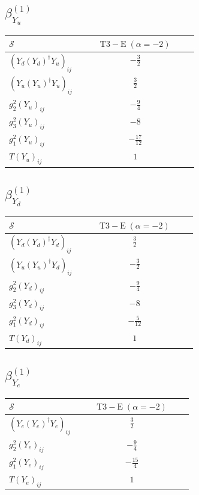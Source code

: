 \documentclass[9pt]{article}
\begin{document}
\subsection*{$ \beta_{Y_u}^{(1)} $}
\begin{longtable}{@{}p{0.38\linewidth}c@{}}
\toprule
$\mathcal{S}$ & $ \mathrm{T3-E}\;(\alpha=-2) $ \\
\midrule
$ (Y_d (Y_d)^{\dagger} Y_u)_{ij} $ & $ - \frac{3}{2} $ \\
$ (Y_u (Y_u)^{\dagger} Y_u)_{ij} $ & $ \frac{3}{2} $ \\
$ g_2^2 (Y_u)_{ij} $ & $ - \frac{9}{4} $ \\
$ g_3^2 (Y_u)_{ij} $ & $ -8 $ \\
$ g_1^2 (Y_u)_{ij} $ & $ - \frac{17}{12} $ \\
$ T (Y_u)_{ij} $ & $ 1 $ \\
\bottomrule
\end{longtable}
\subsection*{$ \beta_{Y_d}^{(1)} $}
\begin{longtable}{@{}p{0.38\linewidth}c@{}}
\toprule
$\mathcal{S}$ & $ \mathrm{T3-E}\;(\alpha=-2) $ \\
\midrule
$ (Y_d (Y_d)^{\dagger} Y_d)_{ij} $ & $ \frac{3}{2} $ \\
$ (Y_u (Y_u)^{\dagger} Y_d)_{ij} $ & $ - \frac{3}{2} $ \\
$ g_2^2 (Y_d)_{ij} $ & $ - \frac{9}{4} $ \\
$ g_3^2 (Y_d)_{ij} $ & $ -8 $ \\
$ g_1^2 (Y_d)_{ij} $ & $ - \frac{5}{12} $ \\
$ T (Y_d)_{ij} $ & $ 1 $ \\
\bottomrule
\end{longtable}
\subsection*{$ \beta_{Y_e}^{(1)} $}
\begin{longtable}{@{}p{0.38\linewidth}c@{}}
\toprule
$\mathcal{S}$ & $ \mathrm{T3-E}\;(\alpha=-2) $ \\
\midrule
$ (Y_e (Y_e)^{\dagger} Y_e)_{ij} $ & $ \frac{3}{2} $ \\
$ g_2^2 (Y_e)_{ij} $ & $ - \frac{9}{4} $ \\
$ g_1^2 (Y_e)_{ij} $ & $ - \frac{15}{4} $ \\
$ T (Y_e)_{ij} $ & $ 1 $ \\
\bottomrule
\end{longtable}
\end{document}
